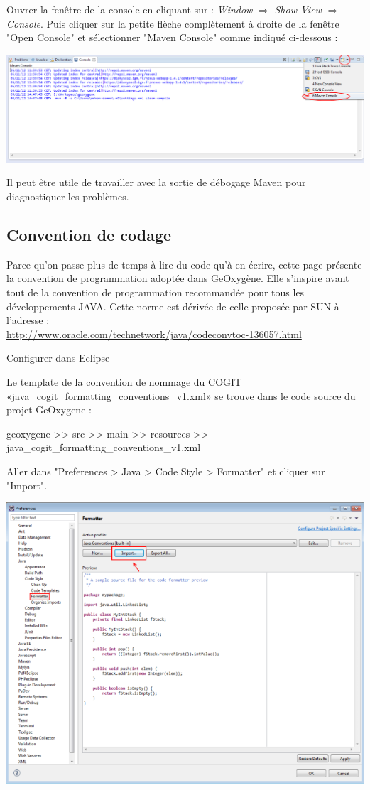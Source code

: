 Ouvrer la fenêtre de la console en cliquant sur : {\emph{Window} $\Rightarrow$ \emph{Show View}  $\Rightarrow$ \emph{Console}}. Puis cliquer sur la petite flèche complètement à droite de la fenêtre "Open Console" et sélectionner "Maven Console" comme indiqué ci-dessous :

\begin{center}
\includegraphics[width=0.5\linewidth]{../../resources/images/guide_installation/geoxygeneEtape5.png}
\end{center}

Il peut être utile de travailler avec la sortie de débogage Maven pour diagnostiquer les problèmes.





\subsection{Convention de codage}

Parce qu'on passe plus de temps à lire du code qu’à en écrire, cette page présente la convention de programmation adoptée dans GeOxygène. Elle s'inspire avant tout de la convention de programmation recommandée pour tous les développements JAVA. Cette norme est dérivée de celle proposée par SUN à l’adresse :\\
{\href{http://www.oracle.com/technetwork/java/codeconvtoc-136057.html}{http://www.oracle.com/technetwork/java/codeconvtoc-136057.html}}  

Configurer dans Eclipse

Le template de la convention de nommage du COGIT «java\_cogit\_formatting\_conventions\_v1.xml» se trouve dans le code source du projet GeOxygene :

geoxygene >> src >> main >> resources >> java\_cogit\_formatting\_conventions\_v1.xml

Aller dans "Preferences > Java > Code Style > Formatter" et cliquer sur "Import". 


\begin{center}
\includegraphics[width=0.5\linewidth]{../../resources/images/guide_installation/ConfigEclipseConventionCodage_1.png}
\end{center}

